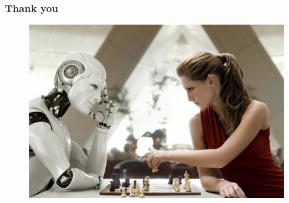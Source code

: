 \documentclass[12pt]{beamer}
\begin{document}

\begin{frame}
\frametitle{Thank you}
\begin{figure}
\includegraphics[width=0.8\linewidth]{ai_chess}
\end{figure}
\end{frame}

\end{document}
